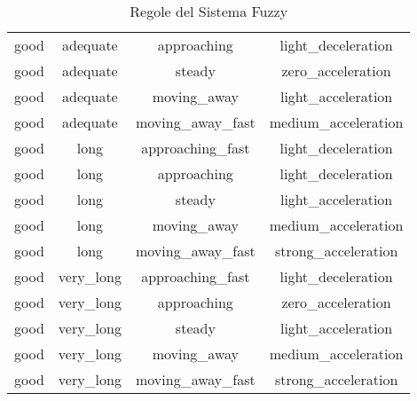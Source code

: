 \begin{table}[!htbp]
{\begin{tabular}{|c|c|c|c|}
            good      & adequate    & approaching          & light\_deceleration \\
            good      & adequate    & steady               & zero\_acceleration \\
            good      & adequate    & moving\_away         & light\_acceleration \\
            good      & adequate    & moving\_away\_fast   & medium\_acceleration \\
            good      & long        & approaching\_fast     & light\_deceleration \\
            good      & long        & approaching          & light\_deceleration \\
            good      & long        & steady               & light\_acceleration \\
            good      & long        & moving\_away         & medium\_acceleration \\
            good      & long        & moving\_away\_fast   & strong\_acceleration \\
            good      & very\_long  & approaching\_fast     & light\_deceleration \\
            good      & very\_long  & approaching          & zero\_acceleration \\
            good      & very\_long  & steady               & light\_acceleration \\
            good      & very\_long  & moving\_away         & medium\_acceleration \\
            good      & very\_long  & moving\_away\_fast   & strong\_acceleration \\
            \hline
    \end{tabular}
    }
    \caption{Regole del Sistema Fuzzy}
    \label{tab:regole_fuzzy}
\end{table}

